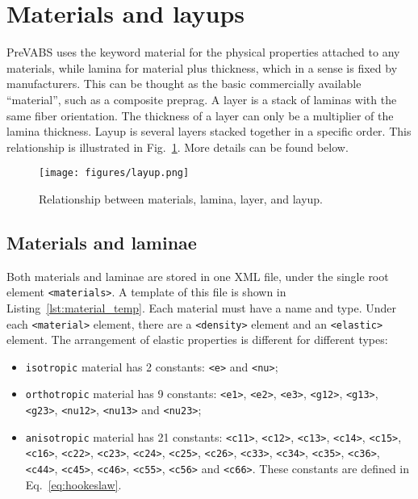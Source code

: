 \documentclass{book}
\begin{document}
\section{Materials and layups}
\label{sec:material}

PreVABS uses the keyword material for the physical properties attached 
to any materials, while lamina for material plus thickness, which in a 
sense is fixed by manufacturers. This can be thought as the basic 
commercially available ``material'', such as a composite preprag. A 
layer is a stack of laminas with the same fiber orientation. The thickness 
of a layer can only be a multiplier of the lamina thickness. Layup is 
several layers stacked together in a specific order. This relationship 
is illustrated in Fig.~\ref{fig:layup}. More details can be found below.

\begin{figure}
  \centerline{\texttt{[image: figures/layup.png]}}
  \caption{Relationship between materials, lamina, layer, and layup.}
  \label{fig:layup}
\end{figure}

\subsection{Materials and laminae}

Both materials and laminae are stored in one XML file, under the single 
root element \lstinline{<materials>}. A template of this file is shown 
in Listing~\ref{lst:material_temp}. Each material must have a name and 
type. Under each \lstinline{<material>} element, there are a \lstinline{<density>} 
element and an \lstinline{<elastic>} element. The arrangement of elastic 
properties is different for different types:
\begin{itemize}
  \item \lstinline{isotropic} material has 2 constants: \lstinline{<e>} 
    and \lstinline{<nu>};
  \item \lstinline{orthotropic} material has 9 constants: \lstinline{<e1>}, 
    \lstinline{<e2>}, \lstinline{<e3>}, \lstinline{<g12>}, \lstinline{<g13>}, 
    \lstinline{<g23>}, \lstinline{<nu12>}, \lstinline{<nu13>} and \lstinline{<nu23>};
  \item \lstinline{anisotropic} material has 21 constants: \lstinline{<c11>}, 
    \lstinline{<c12>}, \lstinline{<c13>}, \lstinline{<c14>}, \lstinline{<c15>}, 
    \lstinline{<c16>}, \lstinline{<c22>}, \lstinline{<c23>}, \lstinline{<c24>}, 
    \lstinline{<c25>}, \lstinline{<c26>}, \lstinline{<c33>}, \lstinline{<c34>}, 
    \lstinline{<c35>}, \lstinline{<c36>}, \lstinline{<c44>}, \lstinline{<c45>}, 
    \lstinline{<c46>}, \lstinline{<c55>}, \lstinline{<c56>} and \lstinline{<c66>}. 
    These constants are defined in Eq.~\eqref{eq:hookeslaw}.
\end{itemize}
\end{document}
